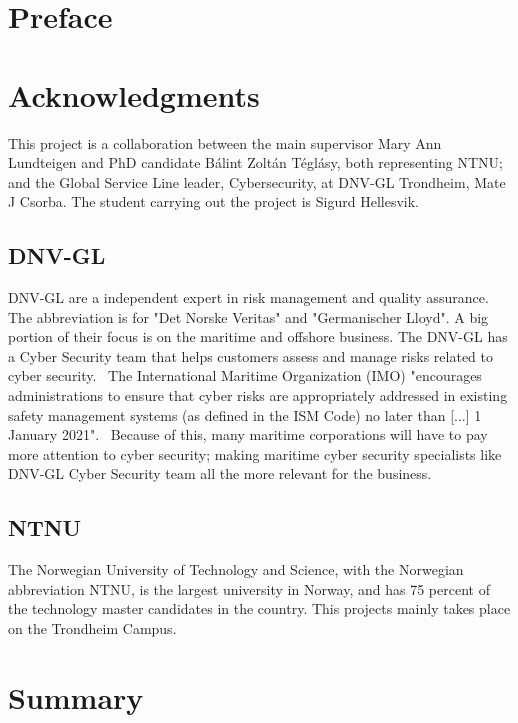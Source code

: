 \section*{Preface}

\section*{Acknowledgments} \label{sec:ack}
This project is a collaboration between the main supervisor Mary Ann Lundteigen and PhD candidate Bálint Zoltán Téglásy, both representing NTNU; and the Global Service Line leader, Cybersecurity, at DNV-GL Trondheim,  Mate J Csorba. The student carrying out the project is Sigurd Hellesvik.

\subsection*{DNV-GL}\label{sec:dnvgl}
DNV-GL are a independent expert in risk management and quality assurance. The abbreviation is for "Det Norske Veritas" and "Germanischer Lloyd". A big portion of their focus is on the maritime and offshore business. The DNV-GL has a Cyber Security team that helps customers assess and manage risks related to cyber security.~\cite{DNVGL_cybersec}  The International Maritime Organization (IMO) "encourages administrations to ensure that cyber risks are appropriately addressed in existing safety management systems (as defined in the ISM Code) no later than [...] 1 January 2021".~\cite{IMO_2021} Because of this, many maritime corporations will have to pay more attention to cyber security; making maritime cyber security specialists like DNV-GL Cyber Security team all the more relevant for the business. 

\subsection*{NTNU}\label{sec:ntnu}
The Norwegian University of Technology and Science, with the Norwegian abbreviation NTNU, is the largest university in Norway, and has 75 percent of the technology master candidates in the country. This projects mainly takes place on the Trondheim Campus.



\section*{Summary}
